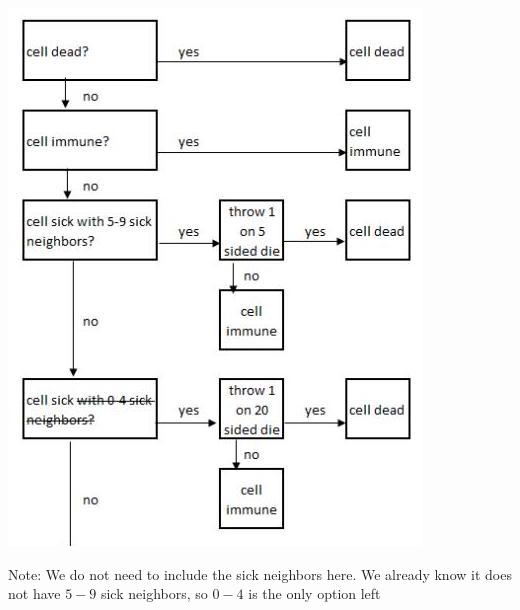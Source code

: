 \documentclass[10pt]{article}
\begin{document}
\includegraphics[max width=\textwidth]{2022_07_05_5945264bba2a5f6ba667g-24}

Note: We do not need to include the sick neighbors here. We already know it does not have $5-9$ sick neighbors, so $0-4$ is the only option left
\end{document}
